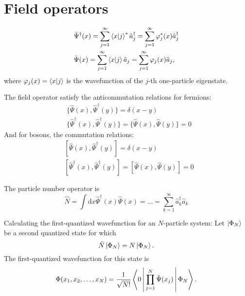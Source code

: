 \documentclass[11pt, a4paper]{article}
\newcommand{\dd}{\mathrm{d}}
\begin{document}
\section{Field operators}
\begin{align*}
    &\hat\Psi^{\dagger}(x) = \sum\limits_{j=1}^{\infty} \braket{x|j}^*\hat a_j^{\dagger} = \sum\limits_{j=1}^{\infty}\varphi^*_j(x)\hat a_j^{\dagger}\\
    &\hat\Psi(x) = \sum\limits_{j=1}^{\infty} \braket{x|j} \hat a_j = \sum\limits_{j=1}^{\infty}\varphi_j(x)\hat a_j,
\end{align*}
where $\varphi_j(x) = \braket{x|j}$ is the wavefunction of the $j$-th one-particle eigenstate.

The field operator satisfy the anticommutation relations for fermions:
\begin{align*}
    &\{\hat\Psi(x),\hat\Psi^{\dagger}(y)\} = \delta(x-y)\\
    &\{\hat\Psi^{\dagger}(x),\hat\Psi^{\dagger}(y)\} = \{\hat\Psi(x),\hat\Psi(y)\} = 0
\end{align*}
And for bosons, the commutation relations:
\begin{align*}
    &[\hat\Psi(x),\hat\Psi^{\dagger}(y)] = \delta(x-y)\\
    &[\hat\Psi^{\dagger}(x),\hat\Psi^{\dagger}(y)] = [\hat\Psi(x),\hat\Psi(y)] = 0
\end{align*}

The particle number operator is 
\begin{equation*}
    \hat N = \int\dd x \hat\Psi^{\dagger}(x)\hat\Psi(x) = \dots = \sum\limits_{k=1}^{\infty}\hat a_k^{\dagger}\hat a_k
\end{equation*}

Calculating the first-quantized wavefunction for an $N$-particle system:
Let $\ket{\Phi_N}$ be a second quantized state for which
\begin{equation*}
    \hat N \ket{\Phi_N} = N \ket{\Phi_N}.
\end{equation*}
The first-quantized wavefunction for this state is 
\begin{equation*}
    \Phi(x_1, x_2, \dots, x_N) = \frac{1}{\sqrt{N!}}\Braket{0| \prod\limits_{j=1}^{N} \hat\Psi(x_j) | \Phi_N }.
\end{equation*}
\end{document}
